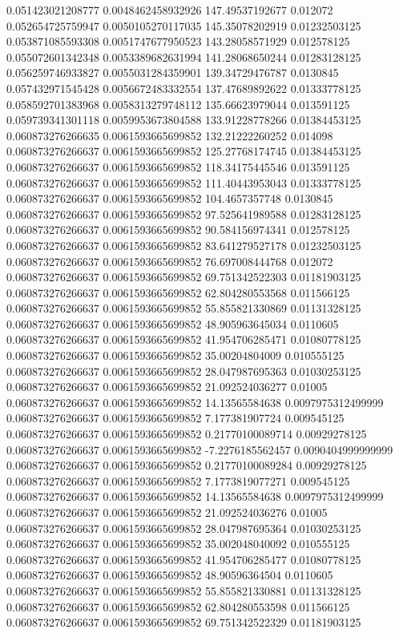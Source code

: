 0.051423021208777 0.0048462458932926 147.49537192677 0.012072
0.052654725759947 0.0050105270117035 145.35078202919 0.01232503125
0.053871085593308 0.0051747677950523 143.28058571929 0.012578125
0.055072601342348 0.0053389682631994 141.28068650244 0.01283128125
0.056259746933827 0.0055031284359901 139.34729476787 0.0130845
0.057432971545428 0.0056672483332554 137.47689892622 0.01333778125
0.058592701383968 0.0058313279748112 135.66623979044 0.013591125
0.059739341301118 0.0059953673804588 133.91228778266 0.01384453125
0.060873276266635 0.0061593665699852 132.21222260252 0.014098
0.060873276266637 0.0061593665699852 125.27768174745 0.01384453125
0.060873276266637 0.0061593665699852 118.34175445546 0.013591125
0.060873276266637 0.0061593665699852 111.40443953043 0.01333778125
0.060873276266637 0.0061593665699852 104.4657357748 0.0130845
0.060873276266637 0.0061593665699852 97.525641989588 0.01283128125
0.060873276266637 0.0061593665699852 90.584156974341 0.012578125
0.060873276266637 0.0061593665699852 83.641279527178 0.01232503125
0.060873276266637 0.0061593665699852 76.697008444768 0.012072
0.060873276266637 0.0061593665699852 69.751342522303 0.01181903125
0.060873276266637 0.0061593665699852 62.804280553568 0.011566125
0.060873276266637 0.0061593665699852 55.855821330869 0.01131328125
0.060873276266637 0.0061593665699852 48.905963645034 0.0110605
0.060873276266637 0.0061593665699852 41.954706285471 0.01080778125
0.060873276266637 0.0061593665699852 35.00204804009 0.010555125
0.060873276266637 0.0061593665699852 28.047987695363 0.01030253125
0.060873276266637 0.0061593665699852 21.092524036277 0.01005
0.060873276266637 0.0061593665699852 14.13565584638 0.0097975312499999
0.060873276266637 0.0061593665699852 7.177381907724 0.009545125
0.060873276266637 0.0061593665699852 0.21770100089714 0.00929278125
0.060873276266637 0.0061593665699852 -7.2276185562457 0.0090404999999999
0.060873276266637 0.0061593665699852 0.21770100089284 0.00929278125
0.060873276266637 0.0061593665699852 7.1773819077271 0.009545125
0.060873276266637 0.0061593665699852 14.13565584638 0.0097975312499999
0.060873276266637 0.0061593665699852 21.092524036276 0.01005
0.060873276266637 0.0061593665699852 28.047987695364 0.01030253125
0.060873276266637 0.0061593665699852 35.002048040092 0.010555125
0.060873276266637 0.0061593665699852 41.954706285477 0.01080778125
0.060873276266637 0.0061593665699852 48.90596364504 0.0110605
0.060873276266637 0.0061593665699852 55.855821330881 0.01131328125
0.060873276266637 0.0061593665699852 62.804280553598 0.011566125
0.060873276266637 0.0061593665699852 69.751342522329 0.01181903125
